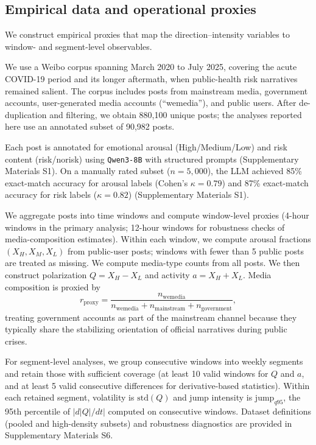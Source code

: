 \documentclass[11pt]{article}
\begin{document}
\subsection{Empirical data and operational proxies}
We construct empirical proxies that map the direction--intensity variables to window- and segment-level observables.

We use a Weibo corpus spanning March 2020 to July 2025, covering the acute COVID-19 period and its longer aftermath, when public-health risk narratives remained salient. The corpus includes posts from mainstream media, government accounts, user-generated media accounts (``wemedia''), and public users. After de-duplication and filtering, we obtain 880,100 unique posts; the analyses reported here use an annotated subset of 90,982 posts.

Each post is annotated for emotional arousal (High/Medium/Low) and risk content (risk/norisk) using \texttt{Qwen3-8B} \citep{Qwen3_8B} with structured prompts (Supplementary Materials S1). On a manually rated subset ($n=5{,}000$), the LLM achieved 85\% exact-match accuracy for arousal labels (Cohen's $\kappa=0.79$) and 87\% exact-match accuracy for risk labels ($\kappa=0.82$) (Supplementary Materials S1).

We aggregate posts into time windows and compute window-level proxies (4-hour windows in the primary analysis; 12-hour windows for robustness checks of media-composition estimates). Within each window, we compute arousal fractions $(X_H,X_M,X_L)$ from public-user posts; windows with fewer than 5 public posts are treated as missing. We compute media-type counts from all posts. We then construct polarization $Q=X_H-X_L$ and activity $a=X_H+X_L$. Media composition is proxied by
\begin{equation}
r_{\text{proxy}}=\frac{n_{\text{wemedia}}}{n_{\text{wemedia}}+n_{\text{mainstream}}+n_{\text{government}}},
\label{eq:rproxy}
\end{equation}
treating government accounts as part of the mainstream channel because they typically share the stabilizing orientation of official narratives during public crises.

For segment-level analyses, we group consecutive windows into weekly segments and retain those with sufficient coverage (at least 10 valid windows for $Q$ and $a$, and at least 5 valid consecutive differences for derivative-based statistics). Within each retained segment, volatility is $\text{std}(Q)$ and jump intensity is $\text{jump}_{q95}$, the 95th percentile of $|d|Q|/dt|$ computed on consecutive windows. Dataset definitions (pooled and high-density subsets) and robustness diagnostics are provided in Supplementary Materials S6.
\end{document}
